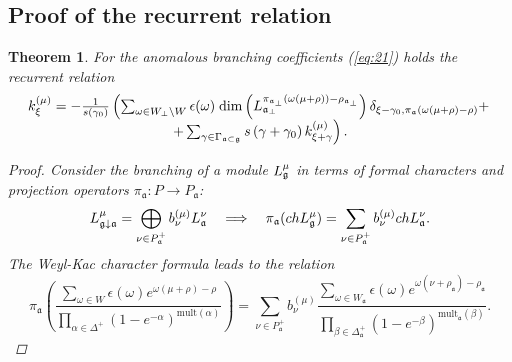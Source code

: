 \documentclass[12pt]{iopart}
\newtheorem{theorem}{Theorem}
\theoremstyle{definition}
\theoremstyle{definition}
\theoremstyle{definition}
\begin{document}
\subsection{Proof of the recurrent relation}
\label{sec:proof}
\begin{theorem}
  For the anomalous branching coefficients (\ref{eq:21}) holds the recurrent relation
  \begin{equation}
    \label{eq:1}
    \begin{array}{c}
      k_{\xi }^{\left( \mu \right) }=-\frac{1}{s\left( \gamma _{0}\right) }\left(
        \sum_{\omega\in W_{\bot}\backslash W} \epsilon(\omega)\;
        {\rm dim}\left(L^{\pi_{\mathfrak{a}_{\bot}}(\omega(\mu+\rho))-\rho_{\mathfrak{a}_{\bot}}}_{\mathfrak{a}_{\bot}}\right)
        \delta_{\xi-\gamma_0,\pi_{\mathfrak{a}}(\omega(\mu+\rho)-\rho)}+ \right.\\
      \left.
        +\sum_{\gamma \in
          \Gamma _{\frak{a}\subset \frak{g}}}s\left( \gamma +\gamma _{0}\right) k_{\xi
          +\gamma }^{\left( \mu \right) }\right).
    \end{array}
  \end{equation}
  \begin{proof}
    Consider the branching of a module $L_{\frak{g}}^{\mu }$ in terms of formal characters and
    projection operators $\pi_{\mathfrak{a}}:P\to P_{\mathfrak{a}}$:
    \begin{equation*}
      L_{\frak{g}\downarrow \frak{a}}^{\mu }=\bigoplus\limits_{\nu \in P_{\frak{a}%
        }^{+}}b_{\nu }^{\left( \mu \right) }L_{\frak{a}}^{\nu }\quad
      \Longrightarrow\quad
      \pi_{\mathfrak{a}}(ch L^{\mu}_{\mathfrak{g}})=
      \sum_{\nu\in P^{+}_{\mathfrak{a}}}b^{(\mu)}_{\nu} ch L^{\nu}_{\mathfrak{a}}.
    \end{equation*}
    The Weyl-Kac character formula leads to
    the relation
    \begin{equation}
      \label{eq:4}
      \pi_{\mathfrak{a}}\left(\frac{\sum_{\omega\in W} \epsilon(\omega) e^{\omega(\mu+\rho)-\rho}}
        {\prod_{\alpha\in\Delta^{+}}(1-e^{-\alpha})^{\mathrm{mult}(\alpha)}}\right) =
      \sum_{\nu\in P^{+}_{\mathfrak{a}}}b^{(\mu)}_{\nu}
      \frac{\sum_{\omega\in W_{\mathfrak{a}}}\epsilon(\omega)
        e^{\omega(\nu+\rho_{\mathfrak{a}})-\rho_{\mathfrak{a}}}}
      {\prod_{\beta\in \Delta_{\mathfrak{a}}^{+}}(1-e^{-\beta})^{\mathrm{mult}_{\mathfrak{a}}(\beta)}}.
    \end{equation}


\end{proof}
\end{theorem}
\end{document}
